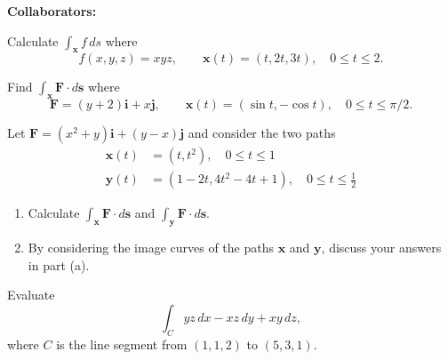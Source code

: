 \documentclass[11pt,letterpaper,boxed]{hmcpset}
\begin{document}
\noindent\textbf{Collaborators:} 


\begin{problem}[Colley 6.1 \#2]
Calculate $\int_{\mathbf{x}} f\,ds$ where
\[
	f(x,y,z) = xyz, \qquad \mathbf{x}(t) = (t,2t,3t), \quad 0\leq t\leq2.
\]
\end{problem}

\begin{solution}
\vfill
\end{solution}
\newpage

\begin{problem}[Colley 6.1 \#9]
Find $\int_{\mathbf{x}}\mathbf{F}\cdot d\mathbf{s}$ where
\[
	\mathbf{F} = (y+2)\mathbf{i}+x\mathbf{j}, \qquad \mathbf{x}(t) = (\sin{t},-\cos{t}), \quad 0\leq t\leq\pi/2.
\]
\end{problem}

\begin{solution}
\vfill

\end{solution}
\newpage

\begin{problem}[Colley 6.1 \#21]
Let $\mathbf{F} = (x^2+y)\mathbf{i}+(y-x)\mathbf{j}$ and consider the two paths
\begin{align*}
	\mathbf{x}(t) &= (t,t^2), \quad 0\leq t \leq 1\\
	\mathbf{y}(t) &= (1-2t, 4t^2-4t+1), \quad 0\leq t\leq \frac{1}{2}
\end{align*}
\begin{enumerate}
\item Calculate $\int_{\mathbf{x}}\mathbf{F}\cdot d\mathbf{s}$ and $\int_{\mathbf{y}}\mathbf{F}\cdot d\mathbf{s}$.
\item By considering the image curves of the paths $\mathbf{x}$ and $\mathbf{y}$, discuss your answers in part (a).
\end{enumerate}
\end{problem}

\begin{solution}
\vfill
\end{solution}
\newpage

\begin{problem}[Colley 6.1 \#31]
Evaluate
\[
	\int_Cyz\,dx -xz\,dy+xy\,dz,
\]
where $C$ is the line segment from $(1,1,2)$ to $(5,3,1)$.
\end{problem}
\end{document}
